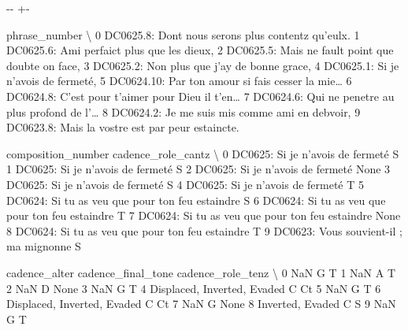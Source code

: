 \documentclass[letterpaper,10pt,english]{sphinxmanual}
\newlength\nbsphinxcodecellspacing
\begin{document}
{

\kern-\sphinxverbatimsmallskipamount\kern-\baselineskip
\kern+\FrameHeightAdjust\kern-\fboxrule
\vspace{\nbsphinxcodecellspacing}

\begin{sphinxVerbatim}[commandchars=\\\{\}]
\llap{\color{nbsphinxout}[21]:\,\hspace{\fboxrule}\hspace{\fboxsep}}                                       phrase\_number  \textbackslash{}
0  DC0625.8: Dont nous serons plus contentz qu'eulx.
1         DC0625.6: Ami perfaict plus que les dieux,
2  DC0625.5: Mais ne fault point que doubte on face,
3        DC0625.2: Non plus que j'ay de bonne grace,
4                DC0625.1: Si je n'avois de fermeté,
5  DC0624.10: Par ton amour si fais cesser la mie{\ldots}
6  DC0624.8: C'est pour t'aimer pour Dieu il t'en{\ldots}
7  DC0624.6: Qui ne penetre au plus profond de l'{\ldots}
8     DC0624.2: Je me suis mis comme ami en debvoir,
9   DC0623.8: Mais la vostre est par peur estaincte.

                                composition\_number cadence\_role\_cantz  \textbackslash{}
0                 DC0625: Si je n'avois de fermeté                  S
1                 DC0625: Si je n'avois de fermeté                  S
2                 DC0625: Si je n'avois de fermeté               None
3                 DC0625: Si je n'avois de fermeté                  S
4                 DC0625: Si je n'avois de fermeté                  T
5  DC0624: Si tu as veu que pour ton feu estaindre                  S
6  DC0624: Si tu as veu que pour ton feu estaindre                  T
7  DC0624: Si tu as veu que pour ton feu estaindre               None
8  DC0624: Si tu as veu que pour ton feu estaindre                  T
9           DC0623: Vous souvient-il ; ma mignonne                  S

                 cadence\_alter cadence\_final\_tone cadence\_role\_tenz  \textbackslash{}
0                          NaN                  G                 T
1                          NaN                  A                 T
2                          NaN                  D              None
3                          NaN                  G                 T
4  Displaced, Inverted, Evaded                  C                Ct
5                          NaN                  G                 T
6  Displaced, Inverted, Evaded                  C                Ct
7                          NaN                  G              None
8             Inverted, Evaded                  C                 S
9                          NaN                  G                 T


\end{sphinxVerbatim}}
\end{document}
